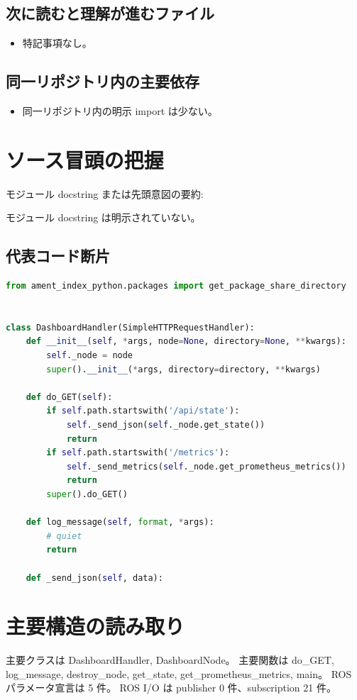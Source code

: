 \documentclass[a4paper,11pt]{article}
\begin{document}
        \subsection*{次に読むと理解が進むファイル}
        \begin{itemize}[leftmargin=1.6em]
        \item 特記事項なし。
        \end{itemize}

        \subsection*{同一リポジトリ内の主要依存}
        \begin{itemize}[leftmargin=1.6em]
        \item 同一リポジトリ内の明示 import は少ない。
        \end{itemize}

        \section*{ソース冒頭の把握}
        モジュール docstring または先頭意図の要約:

        モジュール docstring は明示されていない。

        \subsection*{代表コード断片}
        \begin{lstlisting}[language=Python]
from ament_index_python.packages import get_package_share_directory


class DashboardHandler(SimpleHTTPRequestHandler):
    def __init__(self, *args, node=None, directory=None, **kwargs):
        self._node = node
        super().__init__(*args, directory=directory, **kwargs)

    def do_GET(self):
        if self.path.startswith('/api/state'):
            self._send_json(self._node.get_state())
            return
        if self.path.startswith('/metrics'):
            self._send_metrics(self._node.get_prometheus_metrics())
            return
        super().do_GET()

    def log_message(self, format, *args):
        # quiet
        return

    def _send_json(self, data):
\end{lstlisting}


        \section*{主要構造の読み取り}
        主要クラスは DashboardHandler, DashboardNode。 主要関数は do\_GET, log\_message, destroy\_node, get\_state, get\_prometheus\_metrics, main。 ROS パラメータ宣言は 5 件。 ROS I/O は publisher 0 件、subscription 21 件。
\end{document}

